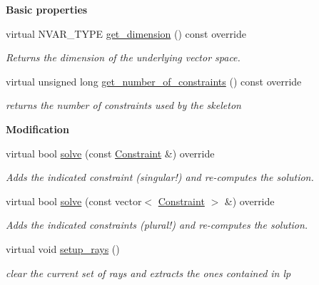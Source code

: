 \begin{Indent}\textbf{ Basic properties}\par
\begin{DoxyCompactItemize}
\item 
\mbox{\label{group___c_l_s_solvers_a5a5f372696416caeae454ce78e9acb86}} 
virtual N\+V\+A\+R\+\_\+\+T\+Y\+PE \hyperlink{group___c_l_s_solvers_a5a5f372696416caeae454ce78e9acb86}{get\+\_\+dimension} () const override
\begin{DoxyCompactList}\small\item\em Returns the dimension of the underlying vector space. \end{DoxyCompactList}\item 
virtual unsigned long \hyperlink{group___c_l_s_solvers_afb7f014f84eb37026fe26f8c3114c0f0}{get\+\_\+number\+\_\+of\+\_\+constraints} () const override
\begin{DoxyCompactList}\small\item\em returns the number of constraints used by the skeleton \end{DoxyCompactList}\end{DoxyCompactItemize}
\end{Indent}
\begin{Indent}\textbf{ Modification}\par
\begin{DoxyCompactItemize}
\item 
virtual bool \hyperlink{group___c_l_s_solvers_a9a4a7563d62e4394162aaa4bd08aae29}{solve} (const \hyperlink{group___c_l_s_solvers_class_l_p___solvers_1_1_constraint}{Constraint} \&) override
\begin{DoxyCompactList}\small\item\em Adds the indicated constraint (singular!) and re-\/computes the solution. \end{DoxyCompactList}\item 
virtual bool \hyperlink{group___c_l_s_solvers_a3763d4bc551a98546f1f5be4df49390d}{solve} (const vector$<$ \hyperlink{group___c_l_s_solvers_class_l_p___solvers_1_1_constraint}{Constraint} $>$ \&) override
\begin{DoxyCompactList}\small\item\em Adds the indicated constraints (plural!) and re-\/computes the solution. \end{DoxyCompactList}\item 
\mbox{\label{group___c_l_s_solvers_a1b50fd63c3032192d02d9a1b2411e33a}} 
virtual void \hyperlink{group___c_l_s_solvers_a1b50fd63c3032192d02d9a1b2411e33a}{setup\+\_\+rays} ()
\begin{DoxyCompactList}\small\item\em clear the current set of rays and extracts the ones contained in lp \end{DoxyCompactList}\end{DoxyCompactItemize}
\end{Indent}
